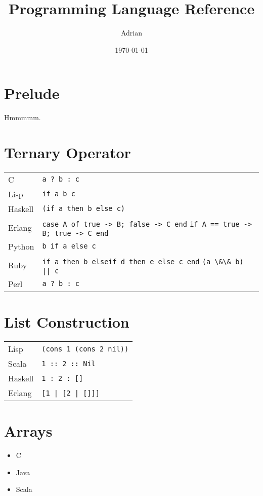 \documentclass{article}
\begin{document}
\title{Programming Language Reference}
\author{Adrian}
\date{\today}
\maketitle

\section{Prelude}
Hmmmmm.

\section{Ternary Operator}
\begin{longtabu} to 0.75\linewidth { X X }
	C & \lstinline$a ? b : c$ \\
	Lisp & \lstinline$if a b c$ \\
	Haskell & \lstinline$(if a then b else c)$ \\
	Erlang & \lstinline$case A of true -> B; false -> C end$ \newline \lstinline$if A == true -> B; true -> C end$ \\
	Python & \lstinline$b if a else c$ \\
	Ruby & \lstinline$if a then b elseif d then e else c end$ \newline \lstinline$(a \&\& b) || c$ \\
	Perl & \lstinline$a ? b : c$ \\
\end{longtabu}

\section{List Construction}
\begin{longtabu} to 0.75\linewidth { X X }
	Lisp & \lstinline$(cons 1 (cons 2 nil))$ \\
	Scala & \lstinline$1 :: 2 :: Nil$ \\
	Haskell & \lstinline$1 : 2 : []$ \\
	Erlang & \lstinline$[1 | [2 | []]]$ \\
\end{longtabu}

\section{Arrays}
\begin{itemize}
	\item C
	\item Java
	\item Scala
\end{itemize}
\end{document}
